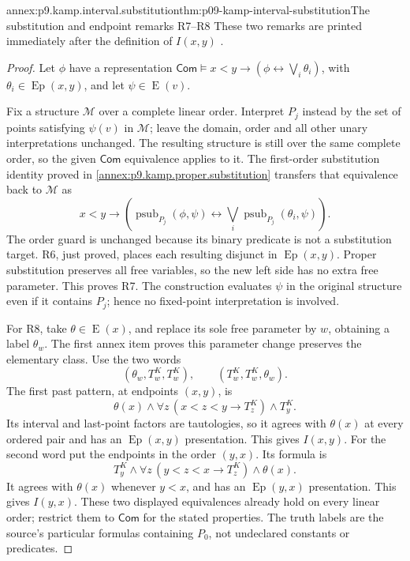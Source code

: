 \begin{annexitem}{annex:p9.kamp.interval.substitution}{thm:p09-kamp-interval-substitution}{The substitution and endpoint remarks R7--R8}
These two remarks are printed immediately after the definition of
\(I(x,y)\) \cite[ch.~III, p.~68]{Kamp1968}.

\begin{proof}
Let \(\phi\) have a representation
\(\mathsf{Com}\models x<y\to(\phi\leftrightarrow\bigvee_i\theta_i)\),
with \(\theta_i\in\operatorname{Ep}(x,y)\), and let
\(\psi\in\operatorname{E}(v)\).

Fix a structure \(\mathcal M\) over a complete linear order.
Interpret \(P_j\) instead by the set of points satisfying
\(\psi(v)\) in \(\mathcal M\); leave the domain, order and all other
unary interpretations unchanged. The resulting structure is still over
the same complete order, so the given \(\mathsf{Com}\) equivalence
applies to it. The first-order substitution identity proved in
\cref{annex:p9.kamp.proper.substitution} transfers that equivalence back
to \(\mathcal M\) as
\[
 x<y\longrightarrow
 \left(\operatorname{psub}_{P_j}(\phi,\psi)
   \longleftrightarrow
        \bigvee_i\operatorname{psub}_{P_j}(\theta_i,\psi)\right).
\]
The order guard is unchanged because its binary predicate is not a
substitution target. R6, just proved, places each resulting disjunct in
\(\operatorname{Ep}(x,y)\). Proper substitution preserves all free
variables, so the new left side has no extra free parameter. This proves
R7. The construction evaluates \(\psi\) in the original structure
even if it contains \(P_j\); hence no fixed-point interpretation is
involved.

For R8, take \(\theta\in\operatorname{E}(x)\), and replace its
sole free parameter by \(w\), obtaining a label \(\theta_w\).
The first annex item proves this parameter change preserves the
elementary class. Use the two words
\[
        (\theta_w,T^K_w,T^K_w),
                 \qquad (T^K_w,T^K_w,\theta_w).
\]
The first past pattern, at endpoints \((x,y)\), is
\[
 \theta(x)\land\forall z\,(x<z<y\to T^K_z)\land T^K_y.
\]
Its interval and last-point factors are tautologies, so it agrees with
\(\theta(x)\) at every ordered pair and has an
\(\operatorname{Ep}(x,y)\) presentation. This gives \(I(x,y)\).
For the second word put the endpoints in the order \((y,x)\). Its
formula is
\[
 T^K_y\land\forall z\,(y<z<x\to T^K_z)\land\theta(x).
\]
It agrees with \(\theta(x)\) whenever \(y<x\), and has an
\(\operatorname{Ep}(y,x)\) presentation. This gives \(I(y,x)\).
These two displayed equivalences already hold on every linear order;
restrict them to \(\mathsf{Com}\) for the stated properties.
The truth labels are the source's particular formulas containing
\(P_0\), not undeclared constants or predicates.
\end{proof}
\end{annexitem}

